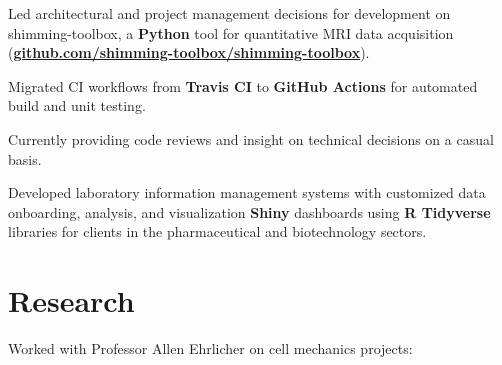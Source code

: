 \documentclass[]{jidicula-resume}
\begin{document}
\vspace{\topsep} %
\begin{tightemize}
\item Led architectural and project management decisions for development on shimming-toolbox, a \textbf{Python} tool for quantitative MRI data acquisition (\href{https://github.com/shimming-toolbox/shimming-toolbox}{\bf github.com/shimming-toolbox/shimming-toolbox}).
\item Migrated CI workflows from \textbf{Travis CI} to \textbf{GitHub Actions} for automated build and unit testing.
\item Currently providing code reviews and insight on technical decisions on a casual basis.
\end{tightemize}
\sectionsep{}

\vspace{\topsep} %
\begin{tightemize}
\item Developed laboratory information management systems with customized data
  onboarding, analysis, and visualization \textbf{Shiny} dashboards using \textbf{R Tidyverse} libraries
  for clients in the pharmaceutical and biotechnology sectors.
\end{tightemize}
\sectionsep{}

\section{Research}
Worked with Professor Allen Ehrlicher on cell mechanics projects:
\end{document}
